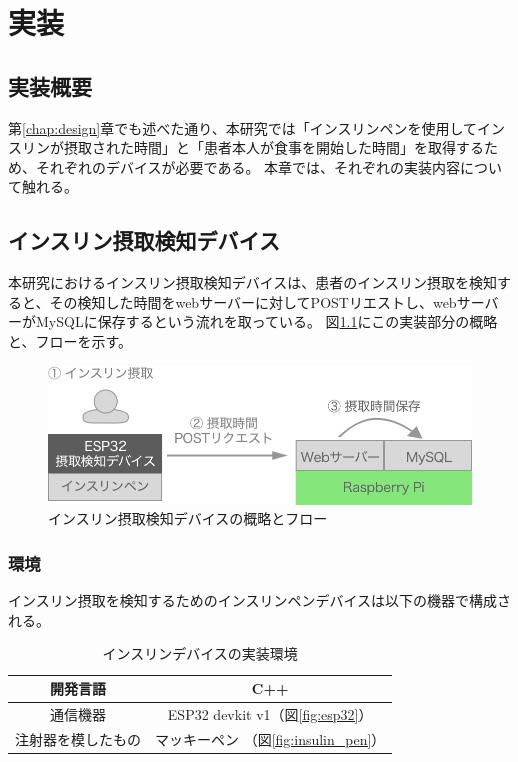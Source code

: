 \chapter{実装}
\label{chap:implementation}

\section{実装概要}

第\ref{chap:design}章でも述べた通り、本研究では「インスリンペンを使用してインスリンが摂取された時間」と「患者本人が食事を開始した時間」を取得するため、それぞれのデバイスが必要である。
本章では、それぞれの実装内容について触れる。

\section{インスリン摂取検知デバイス}
\label{section:insulin_pen_device}

本研究におけるインスリン摂取検知デバイスは、患者のインスリン摂取を検知すると、その検知した時間をwebサーバーに対してPOSTリエストし、webサーバーがMySQLに保存するという流れを取っている。
図\ref{fig:insulin_injection_flow}にこの実装部分の概略と、フローを示す。

\begin{figure}[htbp]
  \caption{インスリン摂取検知デバイスの概略とフロー}
  \label{fig:insulin_injection_flow}
  \begin{center}
    \includegraphics[bb=0 0 1000 270,width=18cm]{assets/insulin_injection_flow.png}
  \end{center}
\end{figure}

\subsection{環境}

インスリン摂取を検知するためのインスリンペンデバイスは以下の機器で構成される。

\begin{table}[htbp]
  \caption{インスリンデバイスの実装環境}
  \label{tb:insulin-device}
  \begin{center}
    \begin{tabular}{|c||c|}
      \hline
      開発言語  & C++ \\\hline
      通信機器  & ESP32 devkit v1（図\ref{fig:esp32}） \\\hline
      注射器を模したもの & マッキーペン （図\ref{fig:insulin_pen}）\\\hline
    \end{tabular}
  \end{center}
\end{table}

